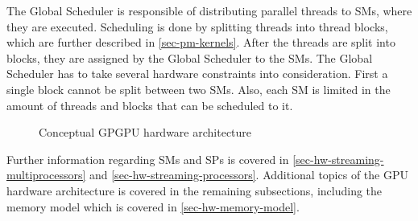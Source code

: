The Global Scheduler is responsible of distributing parallel threads to SMs, where they are executed.
Scheduling is done by splitting threads into thread blocks, which are further described in \cref{sec-pm-kernels}.
After the threads are split into blocks, they are assigned by the Global Scheduler to the SMs.
The Global Scheduler has to take several hardware constraints into consideration.
First a single block cannot be split between two SMs.
Also, each SM is limited in the amount of threads and blocks that can be scheduled to it. 



\begin{figure}[ht]
	\centering
	\caption{Conceptual GPGPU hardware architecture}
	\label{fig:hw-gpu}
\end{figure}


Further information regarding SMs and SPs is covered in \cref{sec-hw-streaming-multiprocessors} and \cref{sec-hw-streaming-processors}.
Additional topics of the GPU hardware architecture is covered in the remaining subsections, including the memory model which is covered in \cref{sec-hw-memory-model}.